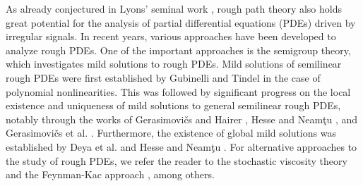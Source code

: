 \documentclass[10pt,a4paper]{article}
\numberwithin{equation}{section}
\begin{document}
As already conjectured in Lyons' seminal work \cite{Ly98}, rough path theory also holds great potential for the analysis of partial differential equations (PDEs) driven by irregular signals.
In recent years, various approaches have been developed to analyze rough PDEs.
One of the important approaches is the semigroup theory, which investigates mild solutions to rough PDEs.
Mild solutions of semilinear rough PDEs were first established by Gubinelli and Tindel \cite{GT10} in the case of
polynomial nonlinearities.
This was followed by significant progress on the local existence and uniqueness of mild solutions to general semilinear rough PDEs, notably through the works of Gerasimovi\v{c}s and Hairer \cite{GH19}, Hesse and Neam\c{t}u \cite{HN19}, and Gerasimovi\v{c}s et al. \cite{GHN21}.
Furthermore, the existence of global mild solutions was established by Deya et al. \cite{DGT12} and Hesse and Neam\c{t}u \cite{HN20,HN22}.
For alternative approaches to the study of rough PDEs, we refer the reader to the stochastic viscosity theory \cite{CaF09,CFO11,FGLS17} and the Feynman-Kac approach \cite{DOR15}, among others.
\end{document}
